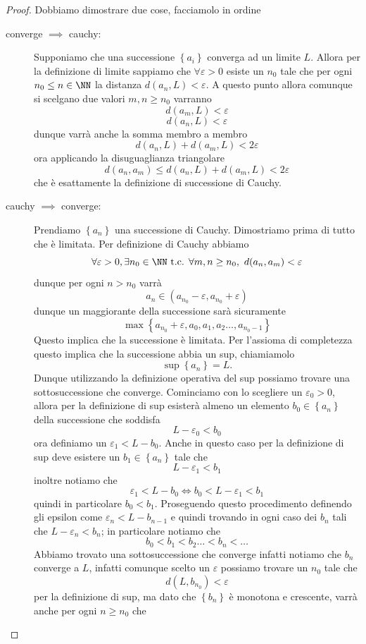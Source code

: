 \documentclass[11pt]{scrartcl}
\begin{document}
	\begin{proof}
		Dobbiamo dimostrare due cose, facciamolo in ordine
		\begin{description}
			\item[converge $\implies$ cauchy:] Supponiamo che una successione $\left\{a_i\right\}$ converga ad un limite $L$. Allora per la definizione di limite sappiamo che $\forall \varepsilon>0$ esiste un $n_0$ tale che per ogni $n_0\le n\in\NN$ la distanza $d(a_n,L)<\varepsilon$. A questo punto allora comunque si scelgano due valori $m,n\ge n_0$ varranno
			$$d(a_m,L)<\varepsilon$$
			$$d(a_n,L)<\varepsilon$$
			dunque varrà anche la somma membro a membro
			$$d(a_n,L)+d(a_m,L)<2\varepsilon$$
			ora applicando la disuguaglianza triangolare
			$$d(a_n,a_m)\le d(a_n,L)+d(a_m,L) < 2\varepsilon$$
			che è esattamente la definizione di successione di Cauchy.
			\item[cauchy $\implies$ converge:] Prendiamo $\left\{a_n\right\}$ una successione di Cauchy. Dimostriamo prima di tutto che è limitata. Per definizione di Cauchy abbiamo
			$$\forall \varepsilon>0 ,\exists n_0\in\NN \text{ t.c. } \forall m,n\ge n_0,\,\,d(a_n,a_m)<\varepsilon$$
			dunque per ogni $n>n_0$ varrà
			$$a_n\in(a_{n_0}-\varepsilon,a_{n_0}+\varepsilon)$$ 
			dunque un maggiorante della successione sarà sicuramente
			$$\max\left\{a_{n_0}+\varepsilon,a_0,a_1,a_2\dots,a_{n_0-1}\right\}$$
			Questo implica che la successione è limitata. Per l'assioma di completezza questo implica che la successione abbia un sup, chiamiamolo 
			$$\sup\left\{a_n\right\}=L.$$
			Dunque utilizzando la definizione operativa del sup possiamo trovare una sottosuccessione che converge. Cominciamo con lo scegliere un $\varepsilon_0>0$, allora per la definizione di sup esisterà almeno un elemento $b_0\in\left\{a_n\right\}$ della successione che soddisfa
			$$L-\varepsilon_0<b_0$$
			ora definiamo un $\varepsilon_1<L-b_0$. Anche in questo caso per la definizione di sup deve esistere un $b_1\in\left\{a_n\right\}$ tale che 
			$$L-\varepsilon_1<b_1$$
			inoltre notiamo che 
			$$\varepsilon_1<L-b_0 \iff b_0<L-\varepsilon_1<b_1$$
			quindi in particolare $b_0<b_1$. Proseguendo questo procedimento definendo gli epsilon come $\varepsilon_n<L-b_{n-1}$ e quindi trovando in ogni caso dei $b_n$ tali che $L-\varepsilon_n<b_n$; in particolare notiamo che 
			$$b_0<b_1<b_2\dots<b_n<\dots$$
			Abbiamo trovato una sottosuccessione che converge infatti notiamo che $b_n$ converge a $L$, infatti comunque scelto un $\varepsilon$ possiamo trovare un $n_0$ tale che
			$$d(L,b_{n_0})<\varepsilon$$
			per la definizione di sup, ma dato che $\left\{b_n\right\}$ è monotona e crescente, varrà anche per ogni $n\ge n_0$ che 

\end{description}
\end{proof}
\end{document}
